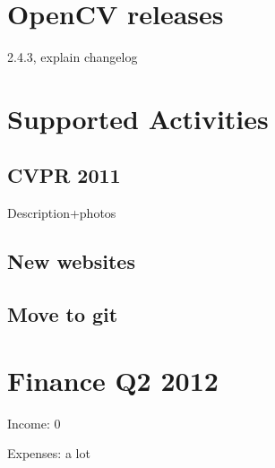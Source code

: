 \documentclass[a4paper,10pt]{article}
\begin{document}
\section*{OpenCV releases}
2.4.3, explain changelog
 
\section*{Supported Activities}

\subsection*{CVPR 2011}

Description+photos

\subsection*{New websites}

\subsection*{Move to git}

\section*{Finance Q2 2012}

Income: 0

Expenses: a lot
\end{document}
